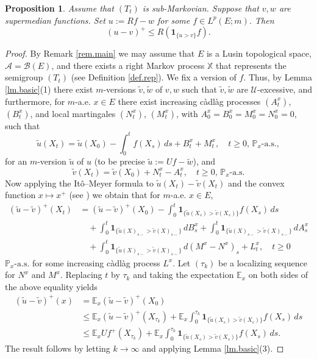 \documentclass[11pt,a4paper,reqno]{amsart}
\newtheorem{proposition}[theorem]{\bf Proposition}
\theoremstyle{definition}
\numberwithin{equation}{section}
\begin{document}
\begin{proposition}
\label{lm2}
Assume that $(T_t)$ is sub-Markovian.   Suppose that  $v,w$ are  supermedian functions.
Set $u:=Rf-w$  for some $f\in L^p(E;m)$.
Then
\[
(u-v)^+\le R(\mathbf1_{\{u>v\}}f).
\]
\end{proposition}
\begin{proof}
By Remark \ref{rem.main} we may assume that $E$ is a Lusin topological space, $\mathcal A=\mathcal B(E)$, 
and  there exists a right Markov process $\mathbb X$  that represents 
the semigroup $(T_t)$ (see Definition \ref{def.rep}). We  fix a version of $f$.   
Thus, by Lemma \ref{lm.basic}(1)  there exist $m$-versions $\tilde v, \tilde w$ of $v, w$ such that 
$\tilde v, \tilde w$ are $\mathcal U$-excessive, and furthermore,  for $m$-a.e. $x\in E$ there exist  increasing 
c\`adl\`ag processes  $(A^x_t)$,  $(B^x_t)$, and  local martingales  
$(N^x_t)$, $(M^x_t)$, with $A^x_0=B^x_0=M^x_0=N^x_0=0$, such that
\[
\tilde u(X_t)=\tilde u(X_0)-\int_0^t f(X_s)\,ds+B^x_t+M^x_t,\quad t\ge 0,\,\mathbb P_x\text{-a.s.},
\]
for an $m$-version $\tilde u$ of $u$ (to be precise $\tilde u:= Uf-\tilde w$),
and 
\[
\tilde v(X_t)=\tilde v(X_0)+N^x_t-A^x_t,\quad t\ge 0,\,\mathbb P_x\text{-a.s.}
\]
Now applying the It\^o--Meyer formula to $\tilde u(X_t)-\tilde v(X_t)$ and the convex function $x\mapsto x^+$
(see \cite[Theorem IV.70]{Protter}) we obtain that for $m$-a.e. $x\in E$,
\[
\begin{split}
(\tilde u-\tilde v)^+(X_t)&=(\tilde u-\tilde v)^+(X_0)-\int_0^t \mathbf1_{\{\tilde u(X_s)>\tilde v(X_s)\}}f(X_s)\,ds 
\\&\quad+\int_0^t \mathbf1_{\{\tilde u(X)_{s-}>\tilde v(X)_{s-}\}}\,dB^x_s
+\int_0^t \mathbf1_{\{\tilde u(X)_{s-}>\tilde v(X)_{s-}\}}\,dA^x_s
\\&\quad+\int_0^t \mathbf1_{\{\tilde u(X)_{s-}>\tilde v(X)_{s-}\}}\,d(M^x-N^x)_s+L^x_t,\quad t\ge 0
\end{split}
\]
$\mathbb P_x\text{-a.s.}$ for some increasing c\`adl\`ag process $L^x$. Let $(\tau_k)$ 
be a localizing sequence for $N^x$ and $M^x$. Replacing $t$ by $\tau_k$ 
and taking the expectation  $\mathbb E_x$ on both sides of the above equality yields 
\[
\begin{split}
(\tilde u-\tilde v)^+(x)&=\mathbb E_x (\tilde u-\tilde v)^+(X_0)\\&\le \mathbb E_x(\tilde u-\tilde v)^+(X_{\tau_k})+
\mathbb E_x\int_0^{\tau_k} \mathbf1_{\{\tilde u(X_s)>\tilde v(X_s)\}}f(X_s)\,ds\\&\le
\mathbb E_xUf^+(X_{\tau_k})+
\mathbb E_x\int_0^{\tau_k} \mathbf1_{\{\tilde u(X_s)>\tilde v(X_s)\}}f(X_s)\,ds.
\end{split}
\]
The result follows by letting $k\to \infty$ and applying Lemma \ref{lm.basic}(3).
\end{proof}
\end{document}
